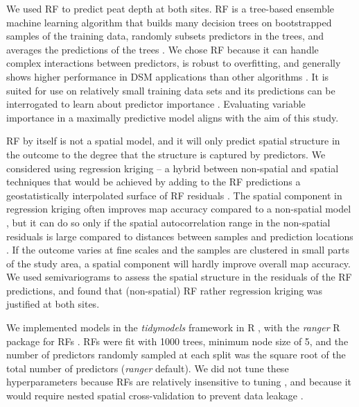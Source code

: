 \documentclass[soil, manuscript]{copernicus}
\begin{document}
We used RF to predict peat depth at both sites.
RF is a tree-based ensemble machine learning algorithm that builds many decision trees on bootstrapped samples of the training data, randomly subsets predictors in the trees, and averages the predictions of the trees \citep{breimanRandomForests2001}.
We chose RF because it can handle complex interactions between predictors, is robust to overfitting, and generally shows higher performance in DSM applications than other algorithms \citep{beguinPredictingSoilProperties2017, nussbaumEvaluationDigitalSoil2018, lamichhaneDigitalSoilMapping2019}.
It is suited for use on relatively small training data sets and its predictions can be interrogated to learn about predictor importance \citep{khaledianSelectingAppropriateMachine2020}.
Evaluating variable importance in a maximally predictive model aligns with the aim of this study.

RF by itself is not a spatial model, and it will only predict spatial structure in the outcome to the degree that the structure is captured by predictors.
We considered using regression kriging -- a hybrid between non-spatial and spatial techniques that would be achieved by adding to the RF predictions a geostatistically interpolated surface of RF residuals \citep{henglGenericFrameworkSpatial2004}.
The spatial component in regression kriging often improves map accuracy compared to a non-spatial model \citep{beguinPredictingSoilProperties2017, lamichhaneDigitalSoilMapping2019, mollaMachineLearningGeostatistical2023}, but it can do so only if the spatial autocorrelation range in the non-spatial residuals is large compared to distances between samples and prediction locations \citep{henglGenericFrameworkSpatial2004, szaboMappingSoilHydraulic2019, takoutsingComparingPredictionPerformance2022}.
If the outcome varies at fine scales and the samples are clustered in small parts of the study area, a spatial component will hardly improve overall map accuracy.
We used semivariograms to assess the spatial structure in the residuals of the RF predictions, and found that (non-spatial) RF rather regression kriging was justified at both sites.

We implemented models in the \emph{tidymodels} framework in R \citep{kuhnTidymodelsCollectionPackages2020}, with the \emph{ranger} R package for RFs \citep[v.0.16,][]{wrightRangerFastImplementation2017}.
RFs were fit with 1000 trees, minimum node size of 5, and the number of predictors randomly sampled at each split was the square root of the total number of predictors (\emph{ranger} default).
We did not tune these hyperparameters because RFs are relatively insensitive to tuning \citep{probstHyperparametersTuningStrategies2019}, and because it would require nested spatial cross-validation to prevent data leakage \citep{schratzHyperparameterTuningPerformance2019}.
\end{document}
